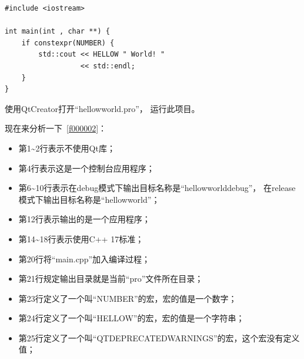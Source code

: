 \begin{lstlisting}[label=f000003,
caption=GoodLuck,
title=\lstlistingname\ \thelstlisting
]
#include <iostream>

int main(int , char **) {
    if constexpr(NUMBER) {
        std::cout << HELLOW " World! "
                  << std::endl;
    }
}
\end{lstlisting}          %


使用QtCreator打开“hellow\underline{\hspace{0.5em}}world.pro”，
运行此项目。

现在来分析一下\lstlistingname\ \ref{f000002}：
\begin{itemize}
\item 第1{\sourcefonttwo\~{}}2行表示不使用Qt库；
\item 第4行表示这是一个控制台应用程序；
\item 第6{\sourcefonttwo\~{}}10行表示在debug模式下输出目标名称是“hellow\underline{\hspace{0.5em}}world\underline{\hspace{0.5em}}debug”，
在release模式下输出目标名称是“hellow\underline{\hspace{0.5em}}world”；
\item 第12行表示输出的是一个应用程序；
\item 第14{\sourcefonttwo\~{}}18行表示使用C{\sourcefonttwo{}+}{\sourcefonttwo{}+} 17标准；
\item 第20行将“main.cpp”加入编译过程；
\item 第21行规定输出目录就是当前“pro”文件所在目录；
\item 第23行定义了一个叫“NUMBER”的宏，宏的值是一个数字；
\item 第24行定义了一个叫“HELLOW”的宏，宏的值是一个字符串；
\item 第25行定义了一个叫“QT\underline{\hspace{0.5em}}DEPRECATED\underline{\hspace{0.5em}}WARNINGS”的宏，这个宏没有定义值；
\end{itemize}

